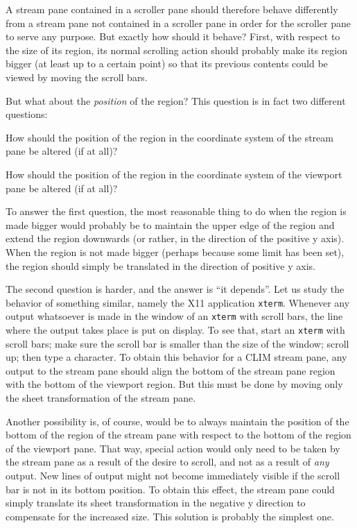 A stream pane contained in a scroller pane should therefore behave
differently from a stream pane not contained in a scroller pane in
order for the scroller pane to serve any purpose.  But exactly how
should it behave?  First, with respect to the size of its region, its
normal scrolling action should probably make its region bigger (at
least up to a certain point) so that its previous contents could be
viewed by moving the scroll bars.  

But what about the \emph{position} of the region?  This question is in
fact two different questions:

\begin{itemize0}
\item How should the position of the region in the coordinate system of the
stream pane be altered (if at all)?
\item How should the position of the region in the coordinate system of the
viewport pane be altered (if at all)?
\end{itemize0}

To answer the first question, the most reasonable thing to do when the
region is made bigger would probably be to maintain the upper edge of
the region and extend the region downwards (or rather, in the
direction of the positive y axis).  When the region is not made bigger
(perhaps because some limit has been set), the region should simply
be translated in the direction of positive y axis. 

The second question is harder, and the answer is ``it depends''.  Let
us study the behavior of something similar, namely the X11 application
\texttt{xterm}.  Whenever any output whatsoever is made in the window
of an \texttt{xterm} with scroll bars, the line where the output takes
place is put on display.  To see that, start an \texttt{xterm} with
scroll bars; make sure the scroll bar is smaller than the size of the
window; scroll up; then type a character.  To obtain this behavior for
a CLIM stream pane, any output to the stream pane should align the
bottom of the stream pane region with the bottom of the viewport
region.  But this must be done by moving only the sheet transformation
of the stream pane.  

Another possibility is, of course, would be to always maintain the
position of the bottom of the region of the stream pane with respect
to the bottom of the region of the viewport pane.  That way, special
action would only need to be taken by the stream pane as a result of
the desire to scroll, and not as a result of \emph{any} output.  New
lines of output might not become immediately visible if the scroll bar
is not in its bottom position.  To obtain this effect, the stream pane
could simply translate its sheet transformation in the negative y
direction to compensate for the increased size.  This solution is
probably the simplest one. 
